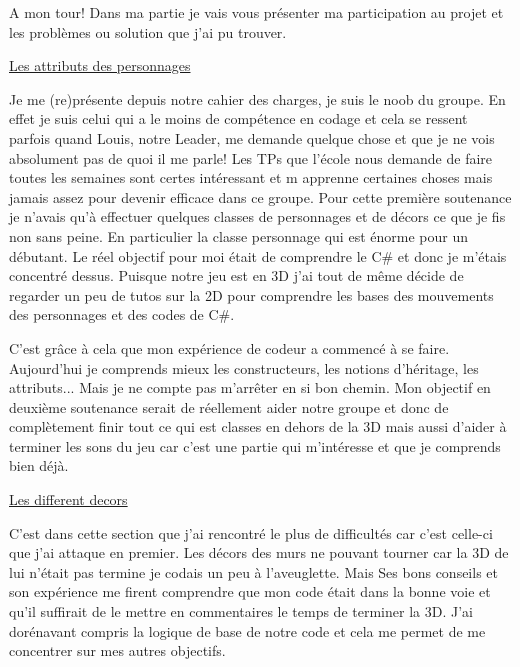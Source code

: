 \documentclass{article}
\begin{document}
\par
A mon tour! Dans ma partie je vais vous présenter ma participation au projet et les problèmes ou solution que j’ai pu trouver.
\newline

\par
\underline{Les attributs des personnages}
\newline

\par
Je me (re)présente depuis notre cahier des charges, je suis le noob du groupe. En effet je suis celui qui a le moins de compétence en codage et cela se ressent parfois quand Louis, notre Leader, me demande quelque chose et que je ne vois absolument pas de quoi il me parle! Les TPs que l'école nous demande de faire toutes les semaines sont certes intéressant et m apprenne certaines choses mais jamais assez pour devenir efficace dans ce groupe. Pour cette première soutenance je n'avais qu'à effectuer quelques classes de personnages et de décors ce que je fis non sans peine. En particulier la classe personnage qui est énorme pour un débutant. Le réel objectif pour moi était de comprendre le C\# et donc je m'étais concentré dessus. Puisque notre jeu est en 3D j'ai tout de même décide de regarder un peu de tutos sur la 2D pour comprendre les bases des mouvements des personnages et des codes de C\#.
\newline

\par
C'est grâce à cela que mon expérience de codeur a commencé à se faire. Aujourd'hui je comprends mieux les constructeurs, les notions d'héritage, les attributs... Mais je ne compte pas m’arrêter en si bon chemin. Mon objectif en deuxième soutenance serait de réellement aider notre groupe et donc de complètement finir tout ce qui est classes en dehors de la 3D mais aussi d'aider à terminer les sons du jeu car c'est une partie qui m'intéresse et que je comprends bien déjà.
\newline

\underline{Les different decors}
\newline
\par
C’est dans cette section que j'ai rencontré le plus de difficultés car c'est celle-ci que j’ai attaque en premier. Les décors des murs ne pouvant tourner car la 3D de lui n'était pas termine je codais un peu à l'aveuglette. Mais Ses bons conseils et son expérience me firent comprendre que mon code était dans la bonne voie et qu’il suffirait de le mettre en commentaires le temps de terminer la 3D. J'ai dorénavant compris la logique de base de notre code et cela me permet de me concentrer sur mes autres objectifs.
\newline
\end{document}
